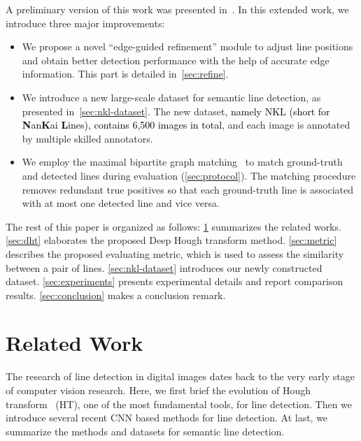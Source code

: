 \documentclass[10pt,journal,cspaper,compsoc]{IEEEtran}
\newcommand{\revise}[1]{{\textcolor{black}{#1}}}
\begin{document}
A preliminary version of this work was presented in~\cite{eccv2020line}.
%
In this extended work, we introduce three major improvements:
\begin{itemize}\setlength\itemsep{0.3em}
  \item We propose a novel ``edge-guided refinement'' module to adjust line positions and obtain better detection performance with the help of accurate edge information.
  This part is detailed in~\cref{sec:refine}.
  \item We introduce a new large-scale dataset for semantic line detection, as presented in~\cref{sec:nkl-dataset}.
  The new dataset, \revise{namely NKL
  (short for \textbf{N}an\textbf{K}ai \textbf{L}ines),
  contains 6,500 images in total}, and each image is annotated by multiple skilled annotators.
  \item We employ the maximal bipartite graph matching~\cite{kuhn1955hungarian} to match ground-truth and detected lines during evaluation (\cref{sec:protocol}).
  The matching procedure removes redundant true positives so that each ground-truth line is associated with
  at most one detected line and vice versa.
\end{itemize}

The rest of this paper is organized as follows:
%
\cref{sec:related-work} summarizes the related works.
%
\cref{sec:dht} elaborates the proposed Deep Hough transform method.
%
\cref{sec:metric} describes the proposed evaluating metric, which is used to assess the similarity between a pair of lines.
%
\cref{sec:nkl-dataset} introduces our newly constructed dataset.
%
\cref{sec:experiments} presents experimental details and report comparison results.
%
\cref{sec:conclusion} makes a conclusion remark.

\section{Related Work}\label{sec:related-work}
The research of line detection in digital images dates back to the very early stage of
computer vision research.
%
Here, we first brief the evolution of Hough transform~\cite{duda1971use} (HT),
one of the most fundamental tools, for line detection.
%
Then we introduce several recent CNN based methods for line detection.
%
At last, we summarize the methods and datasets for semantic line detection.
\end{document}
